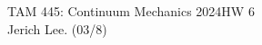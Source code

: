 \documentclass[12pt]{article}
\begin{document}
\noindent TAM 445: Continuum Mechanics 2024\hfill HW 6\\
Jerich Lee. (03/8)

\hrulefill



\pagebreak


\pagebreak

\end{document}
